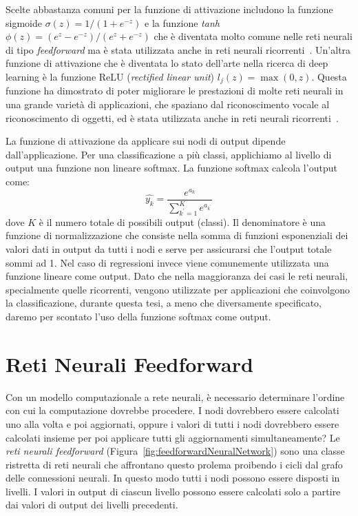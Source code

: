 Scelte abbastanza comuni per la funzione di attivazione includono la funzione
sigmoide $\sigma(z) = 1/(1+e^{-z})$ e la funzione \emph{tanh}
$\phi(z)=(e^z-e^{-z})/(e^z+e^{-z})$ che \`e diventata molto comune nelle reti
neurali di tipo \emph{feedforward} ma \`e stata utilizzata anche in reti neurali
ricorrenti~\cite{Sutskever:2011}. Un'altra funzione di attivazione che \`e
diventata lo stato dell'arte nella ricerca di deep learning \`e la funzione
ReLU (\emph{rectified linear unit}) $l_j(z)=\operatorname{max}(0, z)$. Questa
funzione ha dimostrato di poter migliorare le prestazioni di molte reti neurali
in una grande variet\`a di applicazioni, che spaziano dal riconoscimento vocale
al riconoscimento di oggetti, ed \`e stata utilizzata anche in reti neurali
ricorrenti~\cite{Bengio:2013}.

La funzione di attivazione da applicare sui nodi di output dipende dall'applicazione.
Per una classificazione a pi\`u classi, applichiamo al livello di output una
funzione non lineare softmax. La funzione softmax calcola l'output come:
\begin{equation}
  \hat{y_k} = \frac{e^{a_k}}{\sum_{k^{'}=1}^{K} e^{a_{k^{'}}}}
\end{equation}
dove $K$ \`e il numero totale di possibili output (classi). Il denominatore \`e
una funzione di normalizzazione che consiste nella somma di funzioni esponenziali
dei valori dati in output da tutti i nodi e serve per assicurarsi che l'output
totale sommi ad 1. Nel caso di regressioni invece viene comunemente utilizzata
una funzione lineare come output. Dato che nella maggioranza dei casi le reti
neurali, specialmente quelle ricorrenti, vengono utilizzate per applicazioni che
coinvolgono la classificazione, durante questa tesi, a meno che diversamente
specificato, daremo per scontato l'uso della funzione softmax come output.

\section{Reti Neurali Feedforward}

Con un modello computazionale a rete neurali, \`e necessario determinare
l'ordine con cui la computazione dovrebbe procedere. I nodi dovrebbero essere
calcolati uno alla volta e poi aggiornati, oppure i valori di tutti i nodi
dovrebbero essere calcolati insieme per poi applicare tutti gli aggiornamenti
simultaneamente? Le \emph{reti neurali feedforward}
(Figura~\ref{fig:feedforwardNeuralNetwork}) sono una classe ristretta di reti
neurali che affrontano questo prolema proibendo i cicli dal grafo delle
connessioni neurali. In questo modo tutti i nodi possono essere disposti in
livelli. I valori in output di ciascun livello possono essere calcolati solo a
partire dai valori di output dei livelli precedenti.

